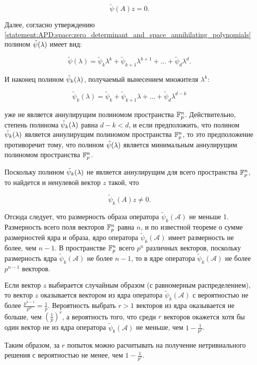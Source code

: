 	$$ \tilde\psi(A) z = 0. $$

Далее, согласно утверждению \ref{statement:APD:space:zero_determinant_and_space_annihilating_polynomials} полином $\tilde\psi (\lambda)$ имеет вид:

	$$ \tilde\psi(\lambda) = \tilde\psi_k \lambda^k + \tilde\psi_{k+1} \lambda^{k+1} + \ldots + \tilde\psi_d \lambda^d. $$

И наконец полином $\tilde\psi_k (\lambda)$, получаемый вынесением множителя $\lambda^k$:

	$$ \tilde\psi_k(\lambda) = \tilde\psi_k + \tilde\psi_{k+1} \lambda + \dots + \tilde\psi_d \lambda^{d-k} $$

уже не является аннулирущим полиномом пространства $\mathbb{F}^{n}_p$. Действительно, степень полинома $\tilde\psi_k (\lambda)$
равна $d-k < d$, и если предположить, что полином $\tilde\psi_k (\lambda)$ является аннулирущим полиномом пространства $\mathbb{F}^{n}_p$,
то это предположение противоречит тому, что полином $\tilde\psi (\lambda)$ является минимальным аннулирущим полиномом
пространства $\mathbb{F}^{n}_p$.

Поскольку полином $\tilde\psi_k (\lambda)$ не является аннулирущим для всего пространства $\mathbb{F}^{n}_p$, то найдется и ненулевой
вектор $z$ такой, что

	$$ \tilde\psi_k(A) z \neq 0. $$

Отсюда следует, что размерность образа оператора $\tilde\psi_k(\mathcal A)$ не меньше 1. Размерность всего поля векторов $\mathbb{F}^{n}_p$
равна $n$, и по известной теореме о сумме размерностей ядра и образа, ядро оператора $\tilde\psi_k(\mathcal A)$ имеет размерность не более,
чем $n-1$. В пространстве $\mathbb{F}^{n}_p$ всего $p^n$ различных векторов, поскольку размерность ядра $\tilde\psi_k(\mathcal A)$ не более $n-1$,
то в ядре оператора $\tilde\psi_k(\mathcal A)$ не более $p^{n-1}$ векторов.

Если вектор $z$ выбирается случайным образом (с равномерным распределением), то вектор $z$ оказывается вектором из ядра оператора
$\tilde\psi_k(\mathcal A)$ с вероятностью не более $\frac{p^{n-1}}{p^n} = \frac{1}{p}$. Вероятность выбрать $r > 1$ векторов из ядра
оказывается не больше, чем $\left ( \frac{1}{p} \right ) ^r$, а вероятность того, что среди $r$ векторов окажется хотя бы один вектор не
из ядра оператора $\tilde\psi_k(\mathcal A)$ не меньше, чем $1 - \frac{1}{p^r}$.

Таким образом, за $r$ попыток можно расчитывать на получение нетривиального решения с вероятностью не менее, чем $1 - \frac{1}{p^r}$.
